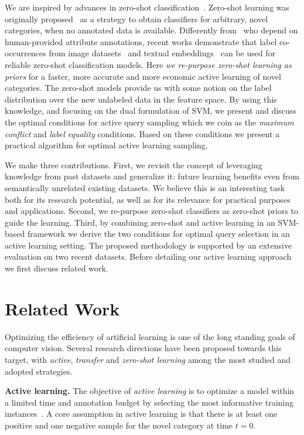 \documentclass[10pt,twocolumn,letterpaper]{article}
\begin{document}
We are inspired by advances in zero-shot classification~\cite{MensinkCVPR2014, lampert13pami, akata13cvpr}. Zero-shot learning was originally proposed~\cite{lampert13pami,socher_NIPS2013} as a strategy to obtain classifiers for arbitrary, novel categories, when no annotated data is available. Differently from~\cite{lampert13pami, akata13cvpr} who depend on human-provided attribute annotations, recent works demonstrate that label co-occurrences from image datasets~\cite{MensinkCVPR2014} and textual embeddings~\cite{devise, conse} can be used for reliable zero-shot classification models. Here \emph{we re-purpose zero-shot learning as priors} for a faster, more accurate and more economic active learning of novel categories. The zero-shot models provide us with some notion on the label distribution over the new unlabeled data in the feature space. By using this knowledge, and focusing on the dual formulation of SVM, we present and discuss the optimal conditions for active query sampling which we coin as the \emph{maximum conflict} and \emph{label equality} conditions. Based on these conditions we present a practical algorithm for optimal active learning sampling.


We make three contributions. First, we revisit the concept of leveraging knowledge from past datasets and generalize it: future learning benefits even from semantically unrelated existing datasets. We believe this is an interesting task both for its research potential, as well as for its relevance for practical purposes and applications. Second, we re-purpose zero-shot classifiers as zero-shot priors to guide the learning. Third, by combining zero-shot and active learning in an SVM-based framework we derive the two conditions for optimal query selection in an active learning setting. The proposed methodology is supported by an extensive evaluation on two recent datasets. Before detailing our active learning approach we first discuss related work.


\section{Related Work}
Optimizing the efficiency of artificial learning is one of the long standing goals of
computer vision. Several research directions have been proposed towards this target, with 
\emph{active}, \emph{transfer} and \emph{zero-shot learning} among the most studied and adopted 
strategies.

\textbf{Active learning.}
The objective of \emph{active learning} is to optimize a model within a limited time and annotation budget by selecting the most informative training instances~\cite{settles2009active}. A core assumption in active learning is that there is at least one positive and one negative sample for the novel category at time $t=0$.
\end{document}
